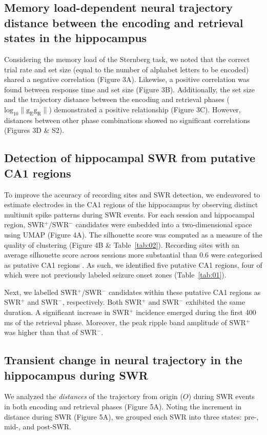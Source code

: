 \subsection{Memory load-dependent neural trajectory distance between the encoding and retrieval states in the hippocampus}
Considering the memory load of the Sternberg task, we noted that the correct trial rate and set size (equal to the number of alphabet letters to be encoded) shared a negative correlation (Figure 3A). Likewise, a positive correlation was found between response time and set size (Figure 3B). Additionally, the set size and the trajectory distance between the encoding and retrieval phases ($\mathrm{log_{10}\lVert g_{E}g_{R} \rVert}$) demonstrated a positive relationship (Figure 3C). However, distances between other phase combinations showed no significant correlations (Figures 3D \& S2).

\subsection{Detection of hippocampal SWR from putative CA1 regions}
To improve the accuracy of recording sites and SWR detection, we endeavored to estimate electrodes in the CA1 regions of the hippocampus by observing distinct multiunit spike patterns during SWR events. For each session and hippocampal region, SWR$^+$/SWR$^-$ candidates were embedded into a two-dimensional space using UMAP (Figure 4A). The silhouette score was computed as a measure of the quality of clustering (Figure 4B \& Table~\ref{tab:02}). Recording sites with an average silhouette score across sessions more substantial than 0.6 were categorised as putative CA1 regions \cite{mcinnes_umap_2018, rousseeuw_silhouettes_1987}. As such, we identified five putative CA1 regions, four of which were not previously labeled seizure onset zones (Table~\ref{tab:01}).

Next, we labelled SWR$^+$/SWR$^-$ candidates within these putative CA1 regions as SWR$^+$ and SWR$^-$, respectively. Both SWR$^+$ and SWR$^-$ exhibited the same duration. A significant increase in SWR$^+$ incidence emerged during the first 400 ms of the retrieval phase. Moreover, the peak ripple band amplitude of SWR$^+$ was higher than that of SWR$^-$.

\subsection{Transient change in neural trajectory in the hippocampus during SWR}
We analyzed the \textit{distances} of the trajectory from origin ($O$) during SWR events in both encoding and retrieval phases (Figure 5A). Noting the increment in distance during SWR (Figure 5A), we grouped each SWR into three states: pre-, mid-, and post-SWR. 

